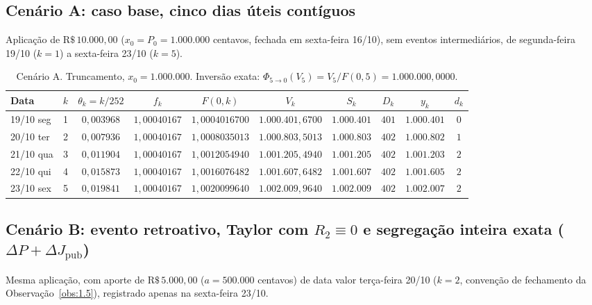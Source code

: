 \documentclass[11pt, a4paper]{article}
\theoremstyle{definition}
\theoremstyle{plain}
\theoremstyle{remark}
\begin{document}
\subsection{Cenário A: caso base, cinco dias úteis contíguos}\label{sec:7.1}

Aplicação de $\text{R\$}\,10.000{,}00$ ($x_0 = P_0 = 1.000.000$ centavos, fechada em sexta-feira 16/10), sem eventos intermediários, de segunda-feira 19/10 ($k=1$) a sexta-feira 23/10 ($k=5$).

\begin{table}[htbp]
\centering
\small
\begin{tabular}{@{}lcclcccccc@{}}
\toprule
\textbf{Data} & $k$ & $\theta_k = k/252$ & \multicolumn{1}{c}{$f_k$} & $F(0,k)$ & $V_k$ & $S_k$ & $D_k$ & $y_k$ & $d_k$ \\
\midrule
19/10 seg & 1 & $0{,}003968$ & $1{,}00040167$ & $1{,}0004016700$ & $1.000.401{,}6700$ & $1.000.401$ & $401$ & $1.000.401$ & $0$ \\
20/10 ter & 2 & $0{,}007936$ & $1{,}00040167$ & $1{,}0008035013$ & $1.000.803{,}5013$ & $1.000.803$ & $402$ & $1.000.802$ & $1$ \\
21/10 qua & 3 & $0{,}011904$ & $1{,}00040167$ & $1{,}0012054940$ & $1.001.205{,}4940$ & $1.001.205$ & $402$ & $1.001.203$ & $2$ \\
22/10 qui & 4 & $0{,}015873$ & $1{,}00040167$ & $1{,}0016076482$ & $1.001.607{,}6482$ & $1.001.607$ & $402$ & $1.001.605$ & $2$ \\
23/10 sex & 5 & $0{,}019841$ & $1{,}00040167$ & $1{,}0020099640$ & $1.002.009{,}9640$ & $1.002.009$ & $402$ & $1.002.007$ & $2$ \\
\bottomrule
\end{tabular}
\caption{Cenário A. Truncamento, $x_0 = 1.000.000$. Inversão exata: $\Phi_{5 \to 0}(V_5) = V_5 / F(0,5) = 1.000.000{,}0000$.}
\label{tab:6}
\end{table}

\subsection{Cenário B: evento retroativo, Taylor com \texorpdfstring{$R_2 \equiv 0$}{R2 = 0} e segregação inteira exata \texorpdfstring{($\Delta P + \Delta J_{\text{pub}}$)}{(Delta P + Delta J)}}\label{sec:7.2}

Mesma aplicação, com aporte de $\text{R\$}\,5.000{,}00$ ($a = 500.000$ centavos) de data valor terça-feira 20/10 ($k=2$, convenção de fechamento da Observação~\ref{obs:1.5}), registrado apenas na sexta-feira 23/10.
\end{document}

